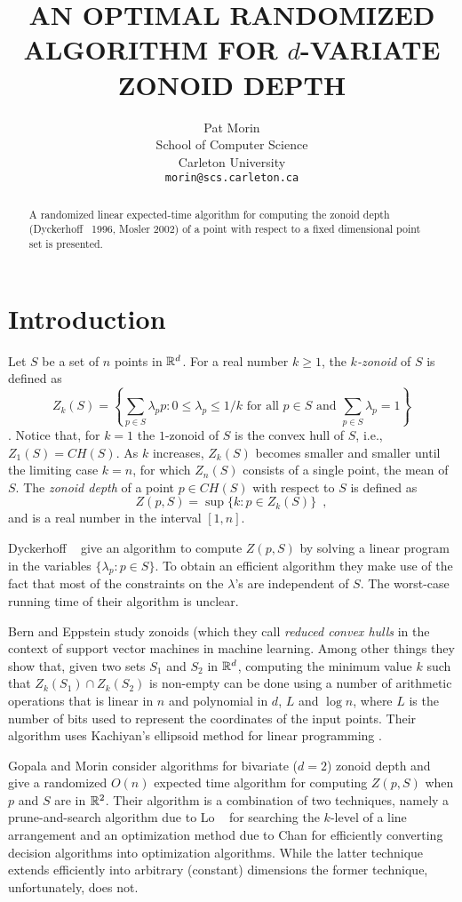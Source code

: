 \documentclass[lotsofwhite]{patmorin}
\title{\MakeUppercase{An Optimal Randomized Algorithm
	for} $d$\MakeUppercase{-Variate Zonoid Depth}}
\author{Pat Morin \\ 
	School of Computer Science \\
	Carleton University \\
	\texttt{morin@scs.carleton.ca}}
\date{}
\newcommand{\CH}{\mathit{CH}}
\begin{document}
\maketitle
\begin{abstract}
A randomized linear expected-time algorithm for computing the zonoid
depth (Dyckerhoff \etal\ 1996, Mosler 2002) of a point with respect to a fixed
dimensional point set is presented.
\end{abstract}

\section{Introduction}

Let $S$ be a set of $n$ points in $\mathbb{R}^d$.
For a real number $k\ge 1$, the \emph{$k$-zonoid} of $S$ is defined as 
\[
      Z_k(S) = \left\{\sum_{p\in S}\lambda_p p
	: \mbox{$0\le \lambda_p \le 1/k$ for all $p\in S$  
	   and $\sum_{p\in S}\lambda_p = 1$}  \right\} 
\] 
\cite{dkm96,m02}.
Notice that, for $k=1$ the $1$-zonoid of $S$ is the convex hull of
$S$,  i.e., $Z_1(S)=\CH(S)$.
As $k$ increases, $Z_k(S)$ becomes smaller and smaller until
the limiting case $k=n$, for which $Z_n(S)$ consists of a single point,
the mean of $S$.  The \emph{zonoid depth} of a point
$p\in\CH(S)$ with respect to $S$ is defined as
\[
     Z(p,S) = \sup\{k : p\in Z_k(S) \} \enspace ,
\]
and is a real number in the interval $[1,n]$.

Dyckerhoff \etal\ \cite{dkm96} give an algorithm to compute $Z(p,S)$
by solving a linear program in the variables $\{\lambda_p:p\in S\}$.
To obtain an efficient algorithm they make use of the fact that most
of the constraints on the $\lambda$'s are independent of $S$.  The
worst-case running time of their algorithm is unclear.

Bern and Eppstein \cite{be01} study zonoids (which they call
\emph{reduced convex hulls} in the context of support vector machines
in machine learning.  Among other things they show that, given two
sets $S_1$ and $S_2$ in $\mathbb{R}^d$, computing the minimum value $k$ such
that $Z_k(S_1)\cap Z_k(S_2)$ is non-empty can be done using a number
of arithmetic operations that is linear in $n$ and polynomial in $d$,
$L$ and $\log n$, where $L$ is the number of bits used to represent
the coordinates of the input points.  Their algorithm uses Kachiyan's
ellipsoid method for linear programming \cite{k79}.

Gopala and Morin \cite{gm06} consider algorithms for bivariate ($d=2$)
zonoid depth and give a randomized $O(n)$ expected time algorithm for
computing $Z(p,S)$ when $p$ and $S$ are in $\mathbb{R}^2$.  Their algorithm is
a combination of two techniques, namely a prune-and-search algorithm
due to Lo \etal\ \cite{lms94} for searching the $k$-level of a
line arrangement and an optimization method due to Chan \cite{c99} for
efficiently converting decision algorithms into optimization
algorithms.   While the latter technique extends efficiently into
arbitrary (constant) dimensions \cite{c04} the former technique,
unfortunately, does not.
\end{document}
